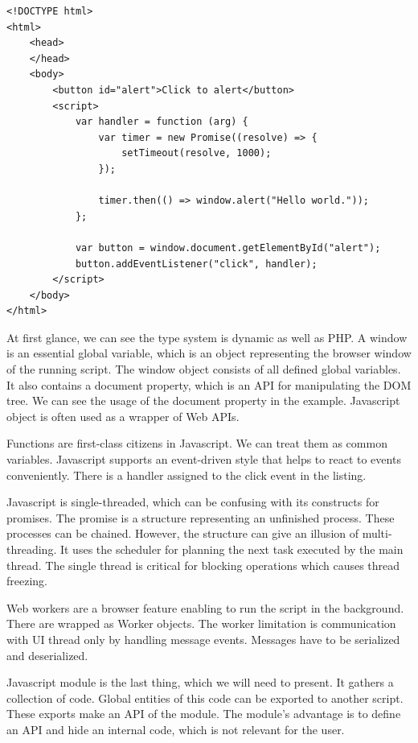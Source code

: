\par
\begin{minipage}[c]{0.95\textwidth}
\begin{lstlisting}[basicstyle=\small, caption=A Javascript code., label={lst:Javascript}]
<!DOCTYPE html>
<html>
	<head>
	</head>
	<body>
		<button id="alert">Click to alert</button>
		<script>
			var handler = function (arg) {
				var timer = new Promise((resolve) => {
					setTimeout(resolve, 1000);
				}); 
        
				timer.then(() => window.alert("Hello world."));
			};  

			var button = window.document.getElementById("alert");
			button.addEventListener("click", handler);
		</script>
	</body>
</html>
\end{lstlisting}
\end{minipage}
\par
At first glance, we can see the type system is dynamic as well as PHP.
A window is an essential global variable, which is an object representing the browser window of the running script.
The window object consists of all defined global variables.
It also contains a document property, which is an API for manipulating the DOM tree.
We can see the usage of the document property in the example.
Javascript object is often used as a wrapper of Web APIs.
\par
Functions are first-class citizens in Javascript.
We can treat them as common variables.
Javascript supports an event-driven style that helps to react to events conveniently.
There is a handler assigned to the click event in the listing.
\par
{}
Javascript is single-threaded, which can be confusing with its constructs for promises.
The promise is a structure representing an unfinished process.
These processes can be chained.
However, the structure can give an illusion of multi-threading. It uses the scheduler for planning the next task executed by the main thread.
The single thread is critical for blocking operations which causes thread freezing.
\par
Web workers  are a browser feature enabling to run the script in the background.
There are wrapped as Worker objects.
The worker limitation is communication with UI thread only by handling message events. 
Messages have to be serialized and deserialized.
\par
Javascript module is the last thing, which we will need to present.
It gathers a collection of code.
Global entities of this code can be exported to another script.
These exports make an API of the module.
The module's advantage is to define an API and hide an internal code, which is not relevant for the user.


